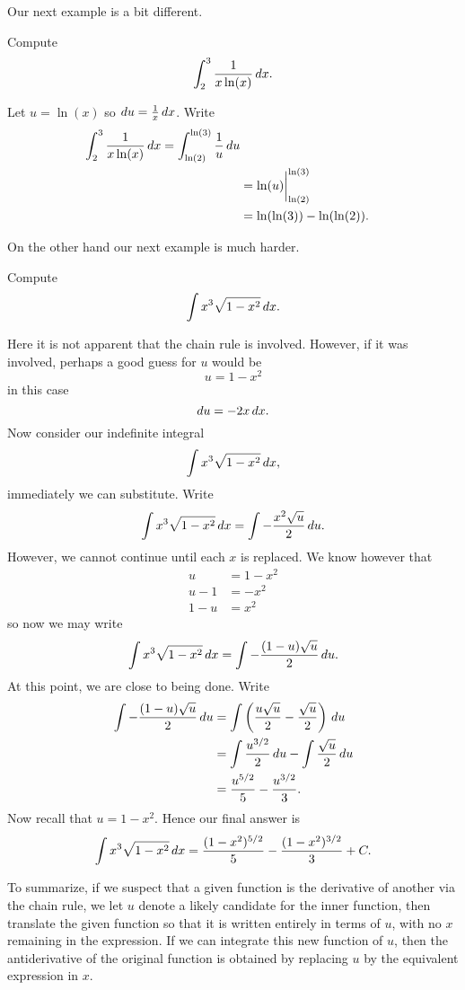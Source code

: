 Our next example is a bit different.

\begin{example}
Compute
\[
\int_{2}^{3} \frac{1}{x\ln(x)} \, d x.
\]
\end{example}

\begin{solution}
Let $u=\ln(x)$ so $du=\frac{1}{x}\, d x$. Write
\begin{align*}
\int_{2}^{3} \frac{1}{x\ln(x)} \, d x = \int_{\ln(2)}^{\ln(3)} \frac{1}{u} \, d u\\
&= \ln(u) \bigg|_{\ln(2)}^{\ln(3)}\\
& = \ln(\ln(3)) - \ln(\ln(2)).
\end{align*}
\end{solution}


On the other hand our next example is much harder.

\begin{example} Compute
\[
\int x^3\sqrt{1-x^2}\, d x.
\]
\end{example}

\begin{solution} 
Here it is not apparent that the chain rule is involved. However, if
it was involved, perhaps a good guess for $u$ would be
\[
u = 1-x^2
\]
in this case
\[
du = -2x \, d x.
\]
Now consider our indefinite integral
\[
\int x^3\sqrt{1-x^2}\, d x,
\]
immediately we can substitute. Write
\[
\int x^3\sqrt{1-x^2}\, d x = \int -\frac{x^2\sqrt{u}}{2}\, d u.
\]
However, we cannot continue until each $x$ is replaced. We know however that 
\begin{align*}
u &= 1-x^2 \\
u -1 &= -x^2\\
1- u &= x^2
\end{align*}
so now we may write
\[
\int x^3\sqrt{1-x^2}\, d x = \int -\frac{(1-u)\sqrt{u}}{2}\, d u.
\]
At this point, we are close to being done. Write
\begin{align*}
\int -\frac{(1-u)\sqrt{u}}{2}\, d u &= \int \left(\frac{u\sqrt{u}}{2} - \frac{\sqrt{u}}{2}\right) \, d u \\
&= \int \frac{u^{3/2}}{2} \, d u - \int \frac{\sqrt{u}}{2} \, d u \\
&= \frac{u^{5/2}}{5} - \frac{u^{3/2}}{3}.
\end{align*}
Now recall that $u = 1-x^2$. Hence our final answer is
\[
\int x^3\sqrt{1-x^2}\, d x = \frac{(1-x^2)^{5/2}}{5} - \frac{(1-x^2)^{3/2}}{3}+C.
\]
\end{solution}

To summarize, if we suspect that a given function is the derivative of
another via the chain rule, we let $u$ denote a likely candidate for
the inner function, then translate the given function so that it is
written entirely in terms of $u$, with no $x$ remaining in the
expression. If we can integrate this new function of $u$, then the
antiderivative of the original function is obtained by replacing $u$
by the equivalent expression in $x$.



